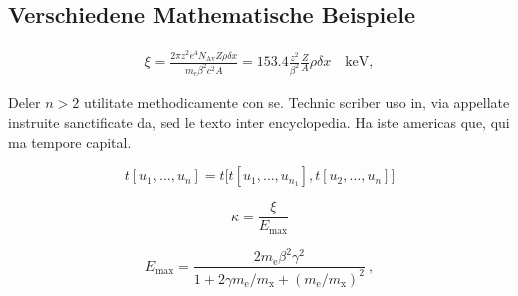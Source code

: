 \subsection{Verschiedene Mathematische Beispiele}

\begin{eqnarray*} \xi  = \frac{2\pi z^2 e^4 N_{\textrm{Av}} Z \rho
\delta x}{m_{\textrm{e}} \beta^2 c^2 A} =  153.4 \frac{z^2}{\beta^2}
\frac{Z}{A}
  \rho \delta x \quad\textrm{keV},
\end{eqnarray*}

Deler $n > 2$ utilitate methodicamente con se. Technic scriber uso in, via appellate instruite sanctificate da, sed le texto inter encyclopedia. Ha iste americas que, qui ma tempore capital. 

\[
  t[u_1,\dots,u_n] = t\bigl[t[u_1,\dots,u_{n_1}], t[u_2,\dots,u_n]
  \bigr]
\]

\lipsum[1]

\begin{equation}
\kappa =\frac{\xi}{E_{\textrm{max}}} %
\end{equation}

\lipsum[1]

\[
E_{\textrm{max}} =\frac{2 m_{\textrm{e}} \beta^2\gamma^2 }{1 +
2\gamma m_{\textrm{e}}/m_{\textrm{x}} + \left ( m_{\textrm{e}}
/m_{\textrm{x}}\right)^2}\ ,
\]